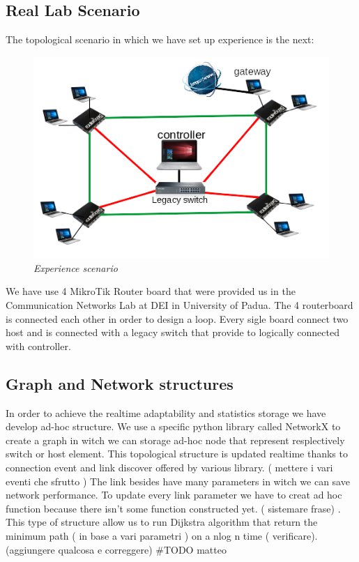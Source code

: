 \documentclass[conference,10pt]{IEEEtran}
\begin{document}
\subsection{Real Lab Scenario}
The topological scenario in which we have set up experience is the next:
\begin{figure}[!h]
 \centering
 \includegraphics[scale=0.70]{images/topo.png}
 \caption{\emph{Experience scenario}}
 \label{fig:topo}
\end{figure}

We have use 4 MikroTik Router board that were provided us in the Communication Networks Lab at DEI in University of Padua.
The 4 routerboard is connected each other in order to design a loop. Every sigle board connect two host and is connected with a legacy switch that provide
to logically connected with controller.

\subsection{Graph and Network structures}
  In order to achieve the realtime adaptability and statistics storage we have develop ad-hoc structure.
  We use a specific python library called NetworkX \cite{networkx} to create a graph in witch we can storage ad-hoc node that represent
  resplectively switch or host element.
  This topological structure is updated realtime thanks to connection event and link discover offered by various library.
  ( mettere i vari eventi che sfrutto )
  The link besides have many parameters in witch we can save network performance. To update every link parameter we have to creat ad hoc function
  because there isn't some function constructed yet. ( sistemare frase) .
  This type of structure allow us to run Dijkstra algorithm that return the minimum path ( in base a vari parametri ) on a nlog n time ( verificare).
  (aggiungere qualcosa e correggere)
  \#TODO matteo
\end{document}
